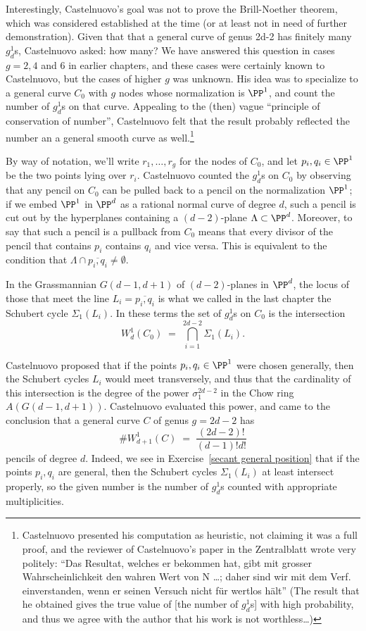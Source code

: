 Interestingly, Castelnuovo's goal was not to prove the Brill-Noether theorem, which was considered established at the time (or at least not in need of further demonstration). Given that
that a general curve of genus 2d-2 has finitely many $g^{1}_{d}$s,
Castelnuovo asked: how many? We have answered this question in cases $g = 2, 4$ and 6 in earlier chapters, and these cases were certainly known to Castelnuovo, but the cases of higher $g$ was unknown.
 His idea was to specialize to a general curve $C_0$ with $g$ nodes  whose normalization is $\PP^1$, and count the number of $g^1_d$s on that curve. Appealing to the (then) vague ``principle of conservation of number'', Castelnuovo felt that the result probably reflected the number an a general smooth curve as well.\footnote{Castelnuovo presented his computation as heuristic, not claiming it was a full proof, and the reviewer of Castelnuovo's paper in the Zentralblatt wrote very politely:
``Das Resultat, welches er bekommen hat, gibt mit grosser Wahrscheinlichkeit den wahren Wert von N \dots; daher sind wir mit dem Verf. einverstanden, wenn er seinen Versuch nicht für wertlos hält''
(The result that he obtained gives the true value of [the number of $g^1_d$s] with high probability, and thus we agree with the author that his work is not worthless\dots)}  

By way of notation, we'll write $r_1,\dots,r_g$ for the nodes of $C_0$, and let $p_i, q_i \in \PP^1$ be the two points lying over $r_i$.
Castelnuovo counted the $g^1_d$s on $C_0$ by observing that any pencil on $C_0$ can be pulled back to a pencil on the normalization $\PP^1$; if we embed $\PP^1$ in $\PP^d$ as a rational normal curve of degree $d$, such a pencil is cut out by the hyperplanes containing
 a $(d-2)$-plane $\Lambda \subset \PP^d$. Moreover, to say that such a pencil is a pullback from $C_0$ means that every divisor of the pencil that contains $p_i$ contains $q_i$ and vice versa. This  is equivalent to the condition that $\Lambda \cap \overline{p_i,q_i} \neq \emptyset$.

In the Grassmannian $G(d-1, d+1)$ of $(d-2)$-planes in $\PP^d$, the locus of those that meet the line $L_i = \overline{p_i,q_i}$ is what we called in the last chapter the Schubert cycle $\Sigma_1(L_i)$. In these terms the set of $g^1_d$s on $C_0$ is the intersection
$$
W^1_d(C_0) \; = \; \bigcap_{i=1}^{2d-2} \Sigma_1(L_i).
$$

Castelnuovo proposed that if the points $p_i, q_i\in \PP^1$ were chosen generally, then the Schubert cycles
$L_i$ would meet transversely, and thus that the cardinality of this intersection is the degree of the power $\sigma_1^{2d-2}$ in the Chow ring $A(G(d-1, d+1))$. Castelnuovo evaluated this power, and came to the conclusion that a general curve $C$ of genus $g=2d-2$ has 
$$
\#W^1_{d+1}(C) \; = \; \frac{(2d-2)!}{(d-1)!d!}
$$
pencils of degree $d$. Indeed, we see
 in Exercise~\ref{secant general position} that if the points $p_i, q_i$ are general, then the Schubert cycles $\Sigma_1(L_i)$ at least intersect properly, so the given number is the number of $g^1_d$s counted with appropriate multiplicities.

